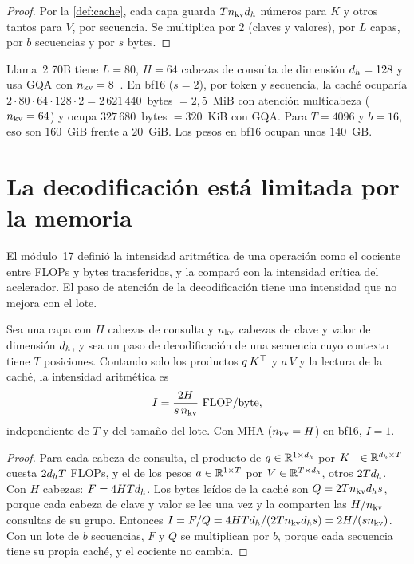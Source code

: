 \begin{proof}
Por la \cref{def:cache}, cada capa guarda $Tn_{\mathrm{kv}}d_{h}$ números para $K$ y otros tantos para $V$, por secuencia. Se multiplica por $2$ (claves y valores), por $L$ capas, por $b$ secuencias y por $s$ bytes.
\end{proof}

\begin{ejemplo}[Llama~2 70B]\label{ej:llama2kv}
Llama~2 70B tiene $L=80$, $H=64$ cabezas de consulta de dimensión $d_{h}=128$ y usa GQA con $n_{\mathrm{kv}}=8$~\cite{llama2}. En bf16 ($s=2$), por token y secuencia, la caché ocuparía $2\cdot 80\cdot 64\cdot 128\cdot 2=2\,621\,440$~bytes $=2{,}5$~MiB con atención multicabeza ($n_{\mathrm{kv}}=64$) y ocupa $327\,680$~bytes $=320$~KiB con GQA. Para $T=4096$ y $b=16$, eso son $160$~GiB frente a $20$~GiB. Los pesos en bf16 ocupan unos $140$~GB.
\end{ejemplo}

\section{La decodificación está limitada por la memoria}

El módulo~17 definió la intensidad aritmética de una operación como el cociente entre FLOPs y bytes transferidos, y la comparó con la intensidad crítica del acelerador. El paso de atención de la decodificación tiene una intensidad que no mejora con el lote.

\begin{proposicion}\label{prop:intensidad}
Sea una capa con $H$ cabezas de consulta y $n_{\mathrm{kv}}$ cabezas de clave y valor de dimensión $d_{h}$, y sea un paso de decodificación de una secuencia cuyo contexto tiene $T$ posiciones. Contando solo los productos $q\,K^{\top}$ y $a\,V$ y la lectura de la caché, la intensidad aritmética es
\[
I=\frac{2H}{s\,n_{\mathrm{kv}}}\ \text{FLOP/byte},
\]
independiente de $T$ y del tamaño del lote. Con MHA ($n_{\mathrm{kv}}=H$) en bf16, $I=1$.
\end{proposicion}

\begin{proof}
Para cada cabeza de consulta, el producto de $q\in\mathbb{R}^{1\times d_{h}}$ por $K^{\top}\in\mathbb{R}^{d_{h}\times T}$ cuesta $2d_{h} T$ FLOPs, y el de los pesos $a\in\mathbb{R}^{1\times T}$ por $V\in\mathbb{R}^{T\times d_{h}}$, otros $2Td_{h}$. Con $H$ cabezas: $F=4HTd_{h}$. Los bytes leídos de la caché son $Q=2Tn_{\mathrm{kv}}d_{h} s$, porque cada cabeza de clave y valor se lee una vez y la comparten las $H/n_{\mathrm{kv}}$ consultas de su grupo. Entonces $I=F/Q=4HTd_{h}/(2Tn_{\mathrm{kv}}d_{h} s)=2H/(sn_{\mathrm{kv}})$. Con un lote de $b$ secuencias, $F$ y $Q$ se multiplican por $b$, porque cada secuencia tiene su propia caché, y el cociente no cambia.
\end{proof}

